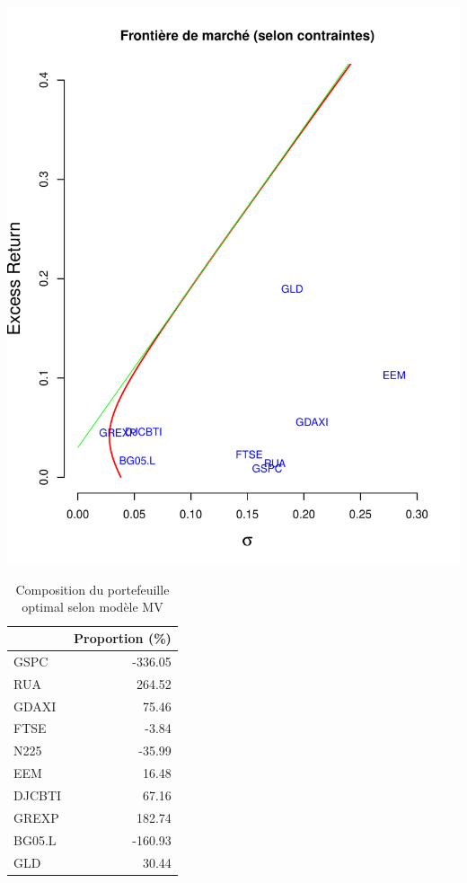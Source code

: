 \documentclass[
]{article}
\begin{document}
\includegraphics{TP-4-E_files/figure-latex/unnamed-chunk-4-1}

\begin{table}

\caption{\label{tab:unnamed-chunk-5}Composition du portefeuille optimal selon modèle MV}
\centering
\begin{tabular}[t]{lr}
\toprule
  & Proportion (\%)\\
\midrule
GSPC & -336.05\\
RUA & 264.52\\
GDAXI & 75.46\\
FTSE & -3.84\\
N225 & -35.99\\
\addlinespace
EEM & 16.48\\
DJCBTI & 67.16\\
GREXP & 182.74\\
BG05.L & -160.93\\
GLD & 30.44\\
\bottomrule
\end{tabular}
\end{table}
\end{document}
